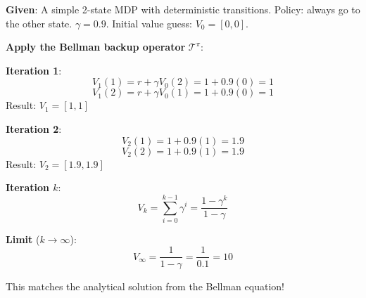\documentclass[11pt,a4paper]{article}
\begin{document}
\begin{tcolorbox}[colback=green!5!white,colframe=green!75!black,title=\textbf{Worked Example: Bellman Operator Application}]
\textbf{Given}: A simple 2-state MDP with deterministic transitions. Policy: always go to the other state. $\gamma = 0.9$. Initial value guess: $V_0 = [0, 0]$.

\textbf{Apply the Bellman backup operator} $\mathcal{T}^\pi$:

\textbf{Iteration 1}:
\[
V_1(1) = r + \gamma V_0(2) = 1 + 0.9(0) = 1
\]
\[
V_1(2) = r + \gamma V_0(1) = 1 + 0.9(0) = 1
\]
Result: $V_1 = [1, 1]$

\textbf{Iteration 2}:
\[
V_2(1) = 1 + 0.9(1) = 1.9
\]
\[
V_2(2) = 1 + 0.9(1) = 1.9
\]
Result: $V_2 = [1.9, 1.9]$

\textbf{Iteration $k$}:
\[
V_k = \sum_{i=0}^{k-1} \gamma^i = \frac{1 - \gamma^k}{1 - \gamma}
\]

\textbf{Limit} ($k \to \infty$):
\[
V_\infty = \frac{1}{1 - \gamma} = \frac{1}{0.1} = 10
\]

This matches the analytical solution from the Bellman equation!
\end{tcolorbox}
\end{document}
